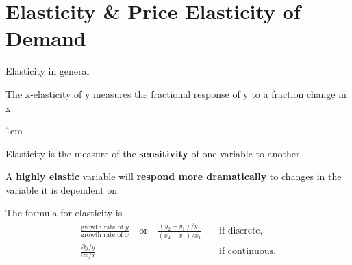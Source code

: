 \documentclass[11pt,aspectratio=43,usenames,dvipsnames]{beamer}
\let\olditemize=\itemize
\let\endolditemize=\enditemize
\renewenvironment{itemize}{\olditemize \itemsep1em}{\endolditemize}
\theoremstyle{definition}
\begin{document}
\section[Elasticity]{Elasticity \& Price Elasticity of Demand}
\label{sec:Elasticity____Price_Elasticity_of_Demand}


\begin{frame}{Elasticity in general}
\label{slide:Elasticity_in_general}

\begin{definition}
 The x-elasticity of y measures the fractional response of y to a fraction change in x
\end{definition}

\begin{itemize}
    \item Elasticity is the measure of the \textbf{sensitivity} of one variable to another.
    \item A \textbf{highly elastic} variable will \textbf{respond more dramatically} to changes in the variable it is dependent on
    \item The formula for elasticity is
        \begin{align*}
         \frac{\text{growth rate of } y}{\text{growth rate of } x} \quad \text{or} \quad \frac{(y_{2} - y_{1}) / y_{1}}{(x_{2} - x_{1}) / x_{1}}
         &
         \quad
         \text{if discrete,}
         \\
         \frac{\partial y / y}{ \partial x / x}
        &
         \quad
        \text{if continuous.}
        \end{align*}
\end{itemize}

\end{frame}
\end{document}

